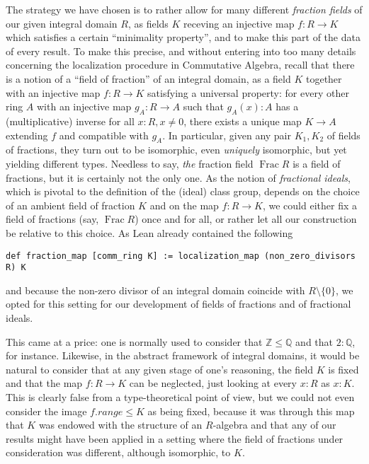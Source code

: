 \documentclass[a4paper,USenglish,cleveref, autoref, thm-restate]{lipics-v2021}
\newcommand{\Q}{\mathbb{Q}}
\newcommand{\Z}{\mathbb{Z}}
\DeclareMathOperator{\Frac}{Frac}
\begin{document}
The strategy we have chosen is to rather allow for many different \emph{fraction fields} of our given integral domain $R$, as fields $K$ receving an injective map $f\colon R\to K$ which satisfies a certain ``minimality property'', and to make this part of the data of every result. To make this precise, and without entering into too many details concerning the localization procedure in Commutative Algebra, recall that there is a notion of a ``field of fraction'' of an integral domain, as a field $K$ together with an injective map $f\colon R\to K$ satisfying a universal property: for every other ring $A$ with an injective map $g_A\colon R\to A$ such that $g_A(x) : A$ has a (multiplicative) inverse for all $x : R, x\neq 0$, there exists a unique map $K\to A$ extending $f$ and compatible with $g_A$. In particular, given any pair $K_1,K_2$ of fields of fractions, they turn out to be isomorphic, even \emph{uniquely} isomorphic, but yet yielding different types. Needless to say, \emph{the} fraction field $\Frac R$ is a field of fractions, but it is certainly not the only one. As the notion of \emph{fractional ideals}, which is pivotal to the definition of the (ideal) class group, depends on the choice of an ambient field of fraction $K$ and on the map $f\colon R\to K$, we could either fix a field of fractions (say, $\Frac R$) once and for all, or rather let all our construction be relative to this choice.  As Lean already contained the following
\begin{lstlisting}
def fraction_map [comm_ring K] := localization_map (non_zero_divisors R) K
\end{lstlisting}
and because the non-zero divisor of an integral domain coincide with $R\setminus\{0\}$, we opted for this setting for our development of fields of fractions and of fractional ideals. 

This came at a price: one is normally used to consider that $\Z\leq \Q$ and that $2 : \Q$, for instance.  Likewise, in the abstract framework of integral domains, it would be natural to consider that at any given stage of one's reasoning, the field $K$ is fixed and that the map $f\colon R\to K$ can be neglected, just looking at every $x:R$ as $x:K$. This is clearly false from a type-theoretical point of view, but we could not even consider the image $f.range \leq K$ as being fixed, because it was through this map that $K$ was endowed with the structure of an $R$-algebra and that any of our results might have been applied in a setting where the field of fractions under consideration was different, although isomorphic, to $K$.
\end{document}

